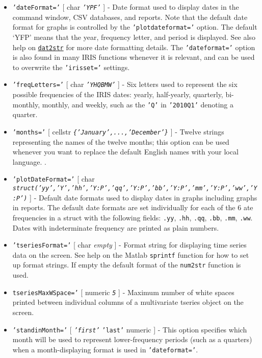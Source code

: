  \begin{itemize}
 \item
   \texttt{'dateFormat='} {[} char \textbar{} \emph{\texttt{'YPF'}} {]} -
   Date format used to display dates in the command window, CSV
   databases, and reports. Note that the default date format for graphs
   is controlled by the \texttt{'plotdateformat='} option. The default
   `YFP' means that the year, frequency letter, and period is displayed.
   See also help on \href{dates/dat2str}{\texttt{dat2str}} for more date
   formatting details. The \texttt{'dateformat='} option is also found in
   many IRIS functions whenever it is relevant, and can be used to
   overwrite the \texttt{'irisset='} settings.
 \item
   \texttt{'freqLetters='} {[} char \textbar{} \emph{\texttt{'YHQBMW'}}
   {]} - Six letters used to represent the six possible frequencies of
   the IRIS dates: yearly, half-yearly, quarterly, bi-monthly, monthly,
   and weekly, such as the \texttt{'Q'} in \texttt{'2010Q1'} denoting a
   quarter.
 \item
   \texttt{'months='} {[} cellstr \textbar{}
   \emph{\texttt{\{'January',...,'December'\}}} {]} - Twelve strings
   representing the names of the twelve months; this option can be used
   whenever you want to replace the default English names with your local
   language. .
 \item
   \texttt{'plotDateFormat='} {[} char \textbar{}
   \emph{\texttt{struct('yy','Y','hh','Y:P','qq','Y:P','bb','Y:P','mm','Y:P','ww','Y:P')}}
   {]} - Default date formats used to display dates in graphs including
   graphs in reports. The default date formats are set individually for
   each of the 6 ate frequencies in a struct with the following fields:
   \texttt{.yy}, \texttt{.hh}, \texttt{.qq}, \texttt{.bb}, \texttt{.mm},
   \texttt{.ww}. Dates with indeterminate frequency are printed as plain
   numbers.
 \item
   \texttt{'tseriesFormat='} {[} char \textbar{} \emph{empty} {]} -
   Format string for displaying time series data on the screen. See help
   on the Matlab \texttt{sprintf} function for how to set up format
   strings. If empty the default format of the \texttt{num2str} function
   is used.
 \item
   \texttt{tseriesMaxWSpace='} {[} numeric \textbar{} \emph{\texttt{5}}
   {]} - Maximum number of white spaces printed between individual
   columns of a multivariate tseries object on the screen.
 \item
   \texttt{'standinMonth='} {[} \emph{\texttt{'first'}} \textbar{}
   \texttt{'last'} \textbar{} numeric {]} - This option specifies which
   month will be used to represent lower-frequency periods (such as a
   quarters) when a month-displaying format is used in
   \texttt{'dateformat='}.
 \end{itemize}
 
